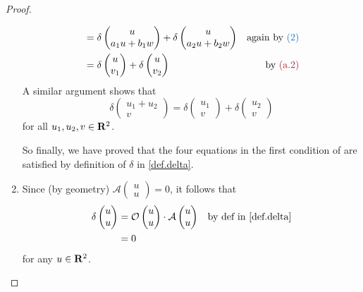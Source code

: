 \begin{proof}
\begin{enumerate}
\begin{align*}
    & = \delta \begin{pmatrix}
            u \\ a_1 u + b_1 w
        \end{pmatrix}
      + \delta \begin{pmatrix}
            u \\ a_2 u + b_2 w
        \end{pmatrix} & \text{again by \BLUE{(2)}} \\
    & = \delta \begin{pmatrix}
            u \\ v_1
        \end{pmatrix}
      + \delta \begin{pmatrix}
            u \\ v_2
        \end{pmatrix} & \text{by \MAROON{(a.2)}}
\end{align*}
A similar argument shows that
\[
    \delta \begin{pmatrix}
        u_1 + u_2 \\ v
    \end{pmatrix}
    = \delta \begin{pmatrix}
            u_1 \\ v
        \end{pmatrix}
      + \delta \begin{pmatrix}
            u_2 \\ v
        \end{pmatrix}
\]
for all \(u_1, u_2, v \in \mathbf{R}^2\).

So finally, we have proved that the four equations in the first condition of  are satisfied by definition of \(\delta\) in \ref{def.delta}.

\item
Since (by geometry) \(\mathcal{A} \begin{pmatrix} u \\ u \end{pmatrix} = 0\), it follows that
\begin{align*}
    \delta \begin{pmatrix} u \\ u \end{pmatrix}
    & = \mathcal{O} \begin{pmatrix} u \\ u \end{pmatrix} \cdot \mathcal{A} \begin{pmatrix} u \\ u \end{pmatrix} & \text{by def in \ref{def.delta}} \\
    & = 0
\end{align*}
for any \(u \in \mathbf{R}^2\).


\end{enumerate}
\end{proof}
